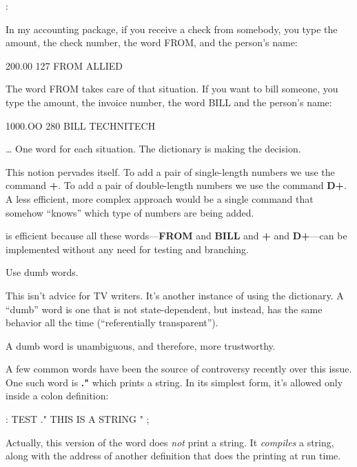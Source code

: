 \begin{interview}
:
\begin{tfquot}
In my accounting package, if you receive a check from somebody, you type
the amount, the check number, the word FROM, and the person's name:

\begin{Code}
200.00 127 FROM ALLIED
\end{Code}
The word FROM takes care of that situation. If you want to bill someone,
you type the amount, the invoice number, the word BILL and the person's
name:

\begin{Code}
1000.OO 280 BILL TECHNITECH
\end{Code}
\dots{} One word for each situation. The dictionary is making the decision.
\end{tfquot}
\end{interview}
This notion pervades \Forth{} itself. To add a pair of single-length
numbers we use the command \textbf{+}. To add a pair of double-length numbers
we use the command \textbf{D+}. A less efficient, more complex approach would
be a single command that somehow ``knows'' which type of numbers are
being added.

\Forth{} is efficient because all these words---\textbf{FROM} and \textbf{BILL} and
\textbf{+} and \textbf{D+}---can be implemented without any need for testing and
branching.

\begin{tip}
Use dumb words.
\end{tip}
This isn't advice for TV writers. It's another instance of using the
dictionary. A ``dumb'' word is one that is not state-dependent, but
instead, has the same behavior all the time (``referentially transparent'').

A dumb word is unambiguous, and therefore, more trustworthy.

A few common \Forth{} words have been the source of controversy
recently over this issue. One such word is \textbf{."} which prints a string.
In its simplest form, it's allowed only inside a colon definition:

\begin{Code}
: TEST   ." THIS IS A STRING " ;
\end{Code}
Actually, this version of the word does \emph{not} print a string. It
\emph{compiles} a string, along with the address of another definition
that does the printing at run time.

